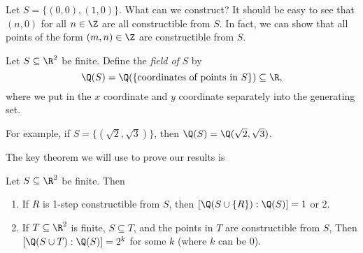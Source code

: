 \documentclass[a4paper]{article}
\begin{document}
\begin{eg}
  Let $S = \{(0, 0), (1, 0)\}$. What can we construct? It should be easy to see that $(n, 0)$ for all $n \in \Z$ are all constructible from $S$. In fact, we can show that all points of the form $(m, n)\in \Z$ are constructible from $S$.
  \begin{center}
  \end{center}
\end{eg}

\begin{defi}[Field of $S$]
  Let $S\subseteq \R^2$ be finite. Define the \emph{field of} $S$ by
  \[
    \Q(S) = \Q(\{\text{coordinates of points in }S\}) \subseteq \R,
  \]
  where we put in the $x$ coordinate and $y$ coordinate separately into the generating set.
\end{defi}
For example, if $S = \{(\sqrt{2}, \sqrt{3})\}$, then $\Q(S) = \Q(\sqrt{2}, \sqrt{3})$.

The key theorem we will use to prove our results is
\begin{thm}
  Let $S\subseteq \R^2$ be finite. Then
  \begin{enumerate}
    \item If $R$ is 1-step constructible from $S$, then $[\Q(S\cup \{R\}):\Q(S)] = 1$ or $2$.
    \item If $T\subseteq \R^2$ is finite, $S\subseteq T$, and the points in $T$ are constructible from $S$, Then $[\Q(S\cup T): \Q(S)] = 2^k$ for some $k$ (where $k$ can be $0$).
  \end{enumerate}
\end{thm}
\end{document}
